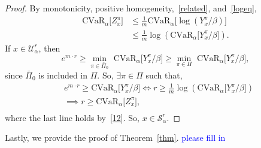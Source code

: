 \documentclass[letterpaper, 10 pt, conference]{ieeeconf}  %
\begin{document}
\begin{proof}
By monotonicity, positive homogeneity,~\eqref{related}, and~\eqref{logeq},
%
\begin{equation}\begin{aligned}
\text{CVaR}_\alpha\big[ Z_x^\pi \big] & \leq \frac{1}{m} \text{CVaR}_\alpha\big[ \log\left( Y_x^\pi/\beta \right) \big] \\
& \leq \frac{1}{m} \log \left(\text{CVaR}_\alpha\big[ Y_x^\pi/\beta \big] \right).
\end{aligned}\label{12}\end{equation}
%
If $x \in \mathcal{U}_\alpha^r$, then
%
\begin{equation*}
e^{m\cdot r} \geq {\underset{\pi \in \bar{\Pi}_0}\min}\text{ CVaR}_\alpha \big[ Y_x^\pi /\beta \big] \geq {\underset{\pi \in \Pi}\min}\text{ CVaR}_\alpha \big[ Y_x^\pi /\beta \big], 
\end{equation*}
%
since $\bar{\Pi}_0$ is included in $\Pi$. So, $\exists \pi \in \Pi$ such that,\footnotemark
{}
\begin{equation*}\begin{aligned}
& e^{m\cdot r} \geq \text{CVaR}_\alpha \big[ Y_x^\pi /\beta \big] \iff r \geq \frac{1}{m}\log \left( \text{CVaR}_\alpha \big[  Y_x^\pi /\beta \big] \right) \\
& \implies r \geq \text{CVaR}_\alpha\big[ Z_x^\pi \big], \\
\end{aligned}\end{equation*}
where the last line holds by~\eqref{12}. So, $x \in \mathcal{S}_\alpha^r$.
\end{proof}

Lastly, we provide the proof of Theorem~\ref{thm}. \textcolor{blue}{please fill in}

\addtolength{\textheight}{-2cm}   %


\end{document}
